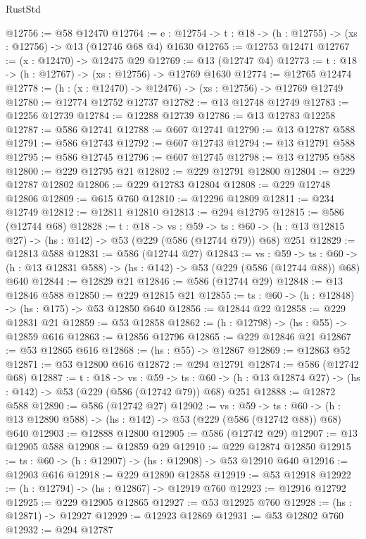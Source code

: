 \begin{lexlean}{RustStd}
\begin{coremodule}
@12756 := @58 @12470
@12764 := {e : @12754} -> {t : @18} -> (h : @12755) -> (xs : @12756) -> @13 (@12746 @68 @4) @1630
@12765 := @12753 @12471
@12767 := (x : @12470) -> @12475 @29
@12769 := @13 (@12747 @4)
@12773 := {t : @18} -> (h : @12767) -> (xs : @12756) -> @12769 @1630
@12774 := @12765 @12474
@12778 := (h : (x : @12470) -> @12476) -> (xs : @12756) -> @12769 @12749
@12780 := @12774 @12752 @12737
@12782 := @13 @12748 @12749
@12783 := @12256 @12739
@12784 := @12288 @12739
@12786 := @13 @12783 @12258
@12787 := @586 @12741
@12788 := @607 @12741
@12790 := @13 @12787 @588
@12791 := @586 @12743
@12792 := @607 @12743
@12794 := @13 @12791 @588
@12795 := @586 @12745
@12796 := @607 @12745
@12798 := @13 @12795 @588
@12800 := @229 @12795 @21
@12802 := @229 @12791 @12800
@12804 := @229 @12787 @12802
@12806 := @229 @12783 @12804
@12808 := @229 @12748 @12806
@12809 := @615 @760
@12810 := @12296 @12809
@12811 := @234 @12749
@12812 := @12811 @12810
@12813 := @294 @12795
@12815 := @586 (@12744 @68)
@12828 := {t : @18} ->
  {vs : @59} ->
  {ts : @60} -> (h : @13 @12815 @27) -> (hs : @142) -> @53 (@229 (@586 (@12744 @79)) @68) @251
@12829 := @12813 @588
@12831 := @586 (@12744 @27)
@12843 := {vs : @59} ->
  {ts : @60} -> (h : @13 @12831 @588) -> (hs : @142) -> @53 (@229 (@586 (@12744 @88)) @68) @640
@12844 := @12829 @21
@12846 := @586 (@12744 @29)
@12848 := @13 @12846 @588
@12850 := @229 @12815 @21
@12855 := {ts : @60} -> (h : @12848) -> (hs : @175) -> @53 @12850 @640
@12856 := @12844 @22
@12858 := @229 @12831 @21
@12859 := @53 @12858
@12862 := (h : @12798) -> (hs : @55) -> @12859 @616
@12863 := @12856 @12796
@12865 := @229 @12846 @21
@12867 := @53 @12865 @616
@12868 := (hs : @55) -> @12867
@12869 := @12863 @52
@12871 := @53 @12800 @616
@12872 := @294 @12791
@12874 := @586 (@12742 @68)
@12887 := {t : @18} ->
  {vs : @59} ->
  {ts : @60} -> (h : @13 @12874 @27) -> (hs : @142) -> @53 (@229 (@586 (@12742 @79)) @68) @251
@12888 := @12872 @588
@12890 := @586 (@12742 @27)
@12902 := {vs : @59} ->
  {ts : @60} -> (h : @13 @12890 @588) -> (hs : @142) -> @53 (@229 (@586 (@12742 @88)) @68) @640
@12903 := @12888 @12800
@12905 := @586 (@12742 @29)
@12907 := @13 @12905 @588
@12908 := @12859 @29
@12910 := @229 @12874 @12850
@12915 := {ts : @60} -> (h : @12907) -> (hs : @12908) -> @53 @12910 @640
@12916 := @12903 @616
@12918 := @229 @12890 @12858
@12919 := @53 @12918
@12922 := (h : @12794) -> (hs : @12867) -> @12919 @760
@12923 := @12916 @12792
@12925 := @229 @12905 @12865
@12927 := @53 @12925 @760
@12928 := (hs : @12871) -> @12927
@12929 := @12923 @12869
@12931 := @53 @12802 @760
@12932 := @294 @12787

\end{coremodule}
\end{lexlean}
